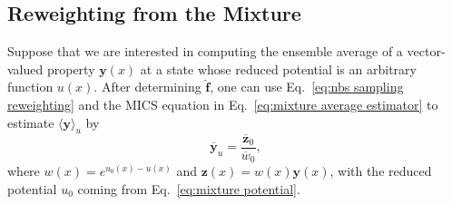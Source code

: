 \documentclass[journal=jctcce,manuscript=article,layout=twocolumn]{achemso}
\newcommand{\vt}[1]{\boldsymbol{\mathbf{#1}}}   %
\newcommand{\avg}[1]{\overline{#1}}             %
\begin{document}
\subsection{Reweighting from the Mixture}

Suppose that we are interested in computing the ensemble average of a vector-valued property $\vt y(x)$ at a state whose reduced potential is an arbitrary function $u(x)$. After determining $\hat{\vt f}$, one can use Eq.~\eqref{eq:nbs sampling reweighting} and the MICS equation in Eq.~\eqref{eq:mixture average estimator} to estimate $\langle \vt y \rangle_u$ by
\begin{equation}
\label{eq:reweighting from mixture}
\avg{\vt y}_u = \frac{\avg{\vt z}_0}{\avg{w}_0},
\end{equation}
where $w(x) = e^{u_0(x) - u(x)}$ and ${\vt z}(x) = w(x) {\vt y}(x)$, with the reduced potential $u_0$ coming from Eq.~\eqref{eq:mixture potential}.
\end{document}
